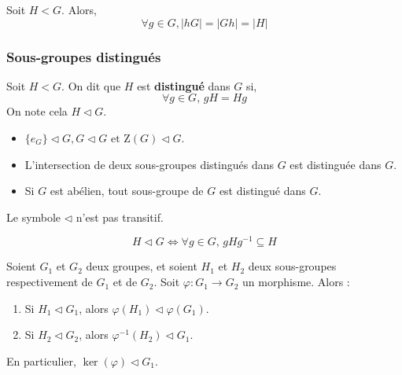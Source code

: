 	\begin{proposition}
		Soit $H < G$. Alors,
		\[ \forall g \in G, \vert hG \vert = \vert Gh \vert = \vert H \vert \]
	\end{proposition}
	
	\subsubsection{Sous-groupes distingués}
	
	
	\begin{definition}
		Soit $H < G$. On dit que $H$ est \textbf{distingué} dans $G$ si,
		\[ \forall g \in G, \, gH = Hg \]
		On note cela $H \lhd G$.
	\end{definition}
	
	\begin{example}
		\begin{itemize}
			\item $\{ e_G \} \lhd G, G \lhd G \text{ et } \mathrm{Z}(G) \lhd G$.
			\item L'intersection de deux sous-groupes distingués dans $G$ est distinguée dans $G$.
			\item Si $G$ est abélien, tout sous-groupe de $G$ est distingué dans $G$.
		\end{itemize}
	\end{example}
	
	
	\begin{remark}
		Le symbole $\lhd$ n'est pas transitif.
	\end{remark}
	
	\begin{proposition}
		\[ H \lhd G \iff \forall g \in G, \, gHg^{-1} \subseteq H \]
	\end{proposition}
	
	
	\begin{proposition}
		Soient $G_1$ et $G_2$ deux groupes, et soient $H_1$ et $H_2$ deux sous-groupes respectivement de $G_1$ et de $G_2$. Soit $\varphi : G_1 \rightarrow G_2$ un morphisme. Alors :
		\begin{enumerate}
			\item Si $H_1 \lhd G_1$, alors $\varphi(H_1) \lhd \varphi(G_1)$.
			\item Si $H_2 \lhd G_2$, alors $\varphi^{-1}(H_2) \lhd G_1$.
		\end{enumerate}
		En particulier, $\ker(\varphi) \lhd G_1$.
	\end{proposition}
	
